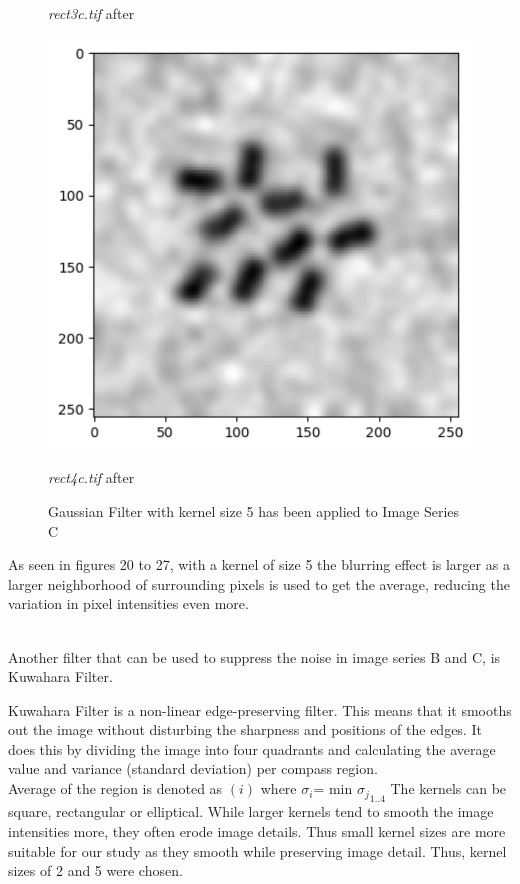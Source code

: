 \documentclass[runningheads]{llncs}
\begin{document}
\begin{figure}[h!]
\begin{minipage}[h]{0.47\linewidth}
\begin{center}
\caption{\emph{rect3c.tif} after}
\label{hc7-Gaussian and Kernel 5}
\end{center}
\end{minipage}
\hfill
\begin{minipage}[h]{0.47\linewidth}
\begin{center}
\includegraphics[width=1\linewidth]{Report/Result_Images/image_hc8.png} 
\caption{\emph{rect4c.tif} after}
\label{hc8-Gaussian and Kernel 5}
\end{center}
\end{minipage}
\caption*{Gaussian Filter with kernel size 5 has been applied to Image Series C}
\label{hc5-8 Gaussian5}
\end{figure}

As seen in figures 20 to 27, with a kernel of size 5 the blurring effect is larger as a larger neighborhood of surrounding pixels is used to get the average, reducing the variation in pixel intensities even more.  

~\\ Another filter that can be used to suppress the noise in image series B and C, is Kuwahara Filter. 
\par Kuwahara Filter is a non-linear edge-preserving filter. This means that it smooths out the image without disturbing the sharpness and positions of the edges. It does this by dividing the image into four quadrants and calculating the average value and variance (standard deviation) per compass region.
~\\ Average of the region is denoted as $(i)$ where  $\sigma_i$= min ${{\sigma_j}}_{1..4}$
The kernels can be square, rectangular or elliptical. While larger kernels tend to smooth the image intensities more, they often erode image details. Thus small kernel sizes are more suitable for our study as they smooth while preserving image detail. Thus, kernel sizes of 2 and 5 were chosen. 
\end{document}

